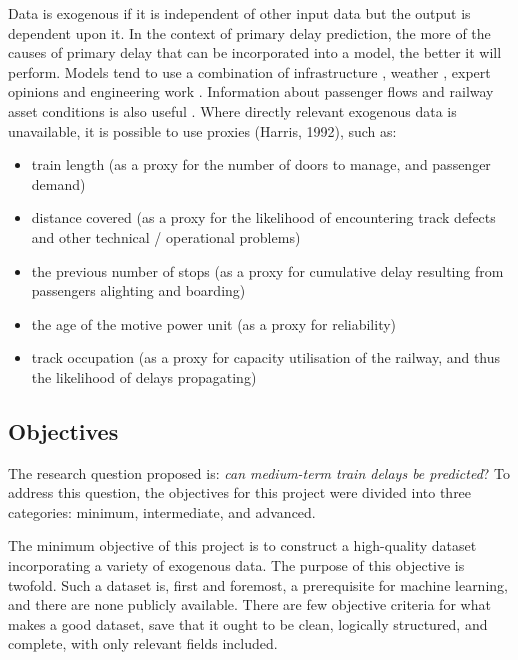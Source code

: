 \documentclass[12pt,a4paper]{article}
\begin{document}
Data is exogenous if it is independent of other input data but the output is dependent upon it. In the context of primary delay prediction, the more of the causes of primary delay that can be incorporated into a model, the better it will perform. Models tend to use a combination of infrastructure \cite{markovic_et_al_2015,milinkovic_et_al_2013,lessan_fu_wen_2019}, weather \cite{oneto_et_al_2016,wang_zhang_2019,oneto_et_al_2017,lessan_fu_wen_2019}, expert opinions \cite{markovic_et_al_2015,oneto_et_al_2019} and engineering work \cite{lessan_fu_wen_2019}. Information about passenger flows and railway asset conditions is also useful \cite{oneto_et_al_2017}. Where directly relevant exogenous data is unavailable, it is possible to use proxies (Harris, 1992), such as: 

\begin{itemize}
	\item{train length (as a proxy for the number of doors to manage, and passenger demand)}
	\item{distance covered (as a proxy for the likelihood of encountering track defects and other technical / operational problems)}
	\item{the previous number of stops (as a proxy for cumulative delay resulting from passengers alighting and boarding)}
	\item{the age of the motive power unit (as a proxy for reliability)}
	\item{track occupation (as a proxy for capacity utilisation of the railway, and thus the likelihood of delays propagating)}
\end{itemize}

\subsection{Objectives}

The research question proposed is: \textit{can medium-term train delays be predicted}? To address this question, the objectives for this project were divided into three categories: minimum, intermediate, and advanced. 

The minimum objective of this project is to construct a high-quality dataset incorporating a variety of exogenous data. The purpose of this objective is twofold. Such a dataset is, first and foremost, a prerequisite for machine learning, and there are none publicly available. There are few objective criteria for what makes a good dataset, save that it ought to be clean, logically structured, and complete, with only relevant fields included.
\end{document}
